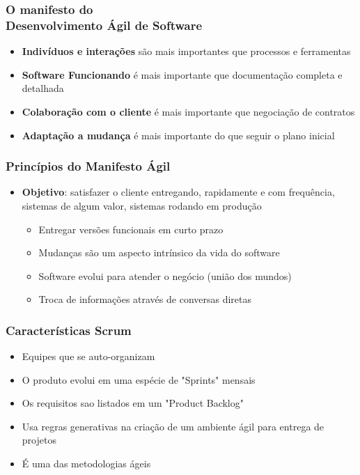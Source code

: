 \begin{frame}
 \frametitle{O manifesto do \\
 \small{Desenvolvimento Ágil de Software}}
 \begin{itemize}
  \item \textbf{Indivíduos e interações} são mais importantes que processos e ferramentas
  \item \textbf{Software Funcionando} é mais importante que documentação completa e detalhada
  \item \textbf{Colaboração com o cliente} é mais importante que negociação de contratos 
  \item \textbf{Adaptação a mudança} é mais importante do que seguir o plano inicial
 \end{itemize}
\end{frame}

\begin{frame}
 \frametitle{Princípios do Manifesto Ágil}
 \begin{itemize}
  \item \textbf{Objetivo}: satisfazer o cliente entregando, rapidamente e com frequência, sistemas de algum valor, sistemas rodando em produção
  \begin{itemize}
   \item Entregar versões  funcionais em curto prazo
   \item Mudanças são um aspecto intrínsico da vida do software
   \item Software evolui para atender o negócio (união dos mundos)
   \item Troca de informações através de conversas diretas
  \end{itemize}
 \end{itemize}
\end{frame}

\begin{frame}
 \frametitle{Características Scrum}
 \begin{itemize}
  \item Equipes que se auto-organizam
  \item O produto evolui em uma espécie  de "Sprints" mensais
  \item Os requisitos sao listados em um "Product Backlog"
  \item Usa regras generativas na criação de um ambiente ágil para entrega de projetos
  \item É uma das metodologias ágeis
 \end{itemize}
\end{frame}

